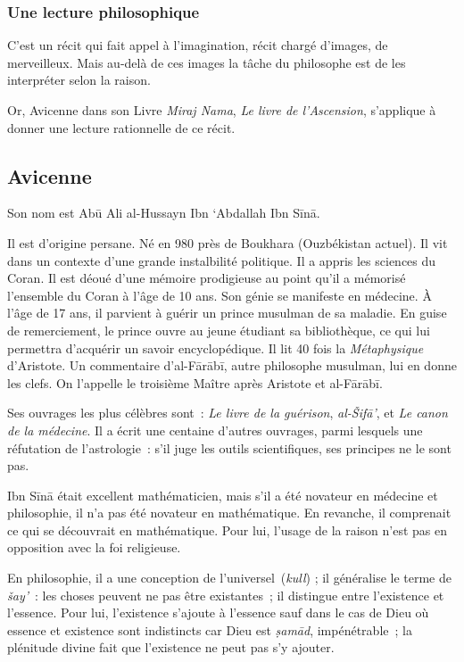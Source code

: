 \subsubsection{Une lecture
philosophique}

C'est un récit qui fait appel à l'imagination, récit chargé d'images, de
merveilleux. Mais au-delà de ces images la tâche du philosophe est de
les interpréter selon la raison.

Or, Avicenne dans son Livre \emph{Miraj Nama}, \emph{Le livre de
l'Ascension}, s'applique à donner une lecture rationnelle de ce récit.


\subsection{
Avicenne}

Son nom est Abū Ali al-Hussayn Ibn `Abdallah Ibn Sīnā.

Il est d'origine persane. Né en 980 près de Boukhara (Ouzbékistan
actuel). Il vit dans un contexte d'une grande instalbilité politique. Il
a appris les sciences du Coran. Il est déoué d'une mémoire prodigieuse
au point qu'il a mémorisé l'ensemble du Coran à l'âge de 10 ans. Son
génie se manifeste en médecine. À l'âge de 17 ans, il parvient à guérir
un prince musulman de sa maladie. En guise de remerciement, le prince
ouvre au jeune étudiant sa bibliothèque, ce qui lui permettra d'acquérir
un savoir encyclopédique. Il lit 40 fois la \emph{Métaphysique}
d'Aristote. Un commentaire d'al-Fārābī, autre philosophe musulman, lui
en donne les clefs. On l'appelle le troisième Maître après Aristote et
al-Fārābī.

Ses ouvrages les plus célèbres sont~: \emph{Le livre de la guérison},
\emph{al-Šifā'}, et \emph{Le canon de la médecine}. Il a écrit une
centaine d'autres ouvrages, parmi lesquels une réfutation de
l'astrologie~: s'il juge les outils scientifiques, ses principes ne le
sont pas.

Ibn Sīnā était excellent mathématicien, mais s'il a été novateur en
médecine et philosophie, il n'a pas été novateur en mathématique. En
revanche, il comprenait ce qui se découvrait en mathématique. Pour lui,
l'usage de la raison n'est pas en opposition avec la foi religieuse.

En philosophie, il a une conception de l'universel~(\emph{kull}) ; il
généralise le terme de \emph{šay'}~: les choses peuvent ne pas être
existantes~; il distingue entre l'existence et l'essence. Pour lui,
l'existence s'ajoute à l'essence sauf dans le cas de Dieu où essence et
existence sont indistincts car Dieu est \emph{ṣamād}, impénétrable~; la
plénitude divine fait que l'existence ne peut pas s'y ajouter.

